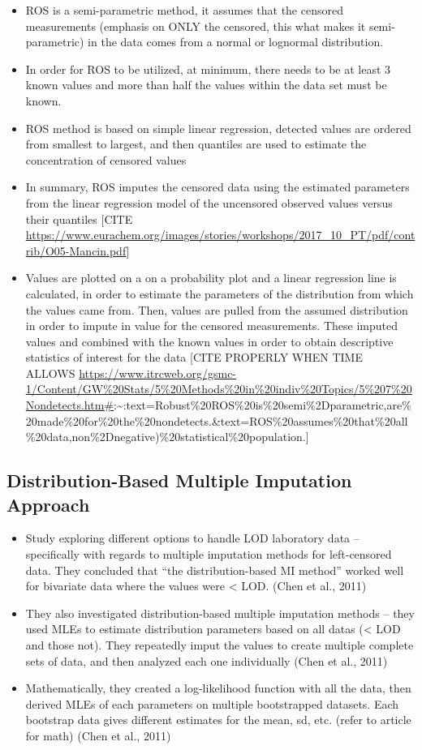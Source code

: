 \documentclass[12pt, twoside]{amherstthesis}
\begin{document}
\begin{itemize}
\item
  ROS is a semi-parametric method, it assumes that the censored measurements (emphasis on ONLY the censored, this what makes it semi-parametric) in the data comes from a normal or lognormal distribution.
\item
  In order for ROS to be utilized, at minimum, there needs to be at least 3 known values and more than half the values within the data set must be known.
\item
  ROS method is based on simple linear regression, detected values are ordered from smallest to largest, and then quantiles are used to estimate the concentration of censored values
\item
  In summary, ROS imputes the censored data using the estimated parameters from the linear regression model of the uncensored observed values versus their quantiles {[}CITE \url{https://www.eurachem.org/images/stories/workshops/2017_10_PT/pdf/contrib/O05-Mancin.pdf}{]}
\item
  Values are plotted on a on a probability plot and a linear regression line is calculated, in order to estimate the parameters of the distribution from which the values came from. Then, values are pulled from the assumed distribution in order to impute in value for the censored measurements. These imputed values and combined with the known values in order to obtain descriptive statistics of interest for the data {[}CITE PROPERLY WHEN TIME ALLOWS \url{https://www.itrcweb.org/gsmc-1/Content/GW\%20Stats/5\%20Methods\%20in\%20indiv\%20Topics/5\%207\%20Nondetects.htm\#}:\textasciitilde:text=Robust\%20ROS\%20is\%20semi\%2Dparametric,are\%20made\%20for\%20the\%20nondetects.\&text=ROS\%20assumes\%20that\%20all\%20data,non\%2Dnegative)\%20statistical\%20population.{]}
\end{itemize}
\hypertarget{DBML}{%
\subsection{Distribution-Based Multiple Imputation Approach}\label{DBML}}
\begin{itemize}
\item
  Study exploring different options to handle LOD laboratory data -- specifically with regards to multiple imputation methods for left-censored data. They concluded that ``the distribution-based MI method'' worked well for bivariate data where the values were \textless{} LOD. (Chen et al., 2011)
\item
  They also investigated distribution-based multiple imputation methods -- they used MLEs to estimate distribution parameters based on all datas (\textless{} LOD and those not). They repeatedly imput the values to create multiple complete sets of data, and then analyzed each one individually (Chen et al., 2011)
\item
  Mathematically, they created a log-likelihood function with all the data, then derived MLEs of each parameters on multiple bootstrapped datasets. Each bootstrap data gives different estimates for the mean, sd, etc. (refer to article for math) (Chen et al., 2011)
\end{itemize}
\end{document}
